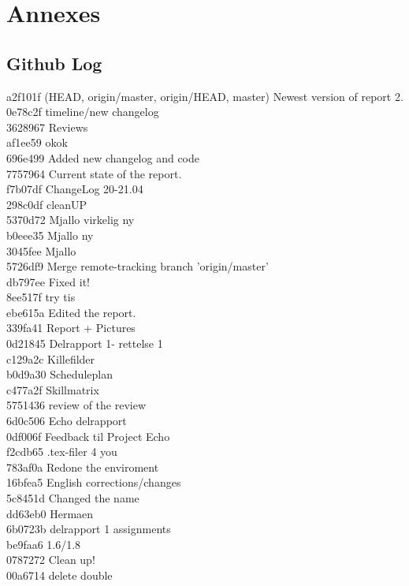 \documentclass[12pt,a4paper]{article}
\begin{document}
\section{Annexes}
\subsection{Github Log}
\noindent\makebox[\linewidth]{\rule{16.5cm}{0.4pt}}
a2f101f (HEAD, origin/master, origin/HEAD, master) Newest version of report 2.\\
0e78c2f timeline/new changelog\\
3628967 Reviews\\
af1ee59 okok\\
696e499 Added new changelog and code\\
7757964 Current state of the report.\\
f7b07df ChangeLog 20-21.04\\
298c0df cleanUP\\
5370d72 Mjallo virkelig ny\\
b0eee35 Mjallo ny\\
3045fee Mjallo\\
5726df9 Merge remote-tracking branch 'origin/master'\\
db797ee Fixed it!\\
8ee517f try tis\\
ebe615a Edited the report.\\
339fa41 Report + Pictures\\
0d21845 Delrapport 1- rettelse 1\\
c129a2c Killefilder\\
b0d9a30 Scheduleplan\\
c477a2f Skillmatrix\\
5751436 review of the review\\
6d0c506 Echo delrapport\\
0df006f Feedback til Project Echo\\
f2cdb65 .tex-filer 4 you\\
783af0a Redone the enviroment\\
16bfea5 English corrections/changes\\
5c8451d Changed the name\\
dd63eb0 Hermaen\\
6b0723b delrapport 1 assignments\\
be9faa6 1.6/1.8\\
0787272 Clean up!\\
00a6714 delete double\\
\end{document}
